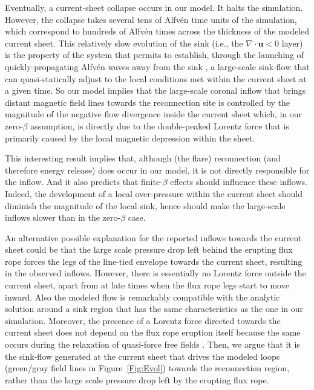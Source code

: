 \documentclass[apj]{emulateapj}
\begin{document}
Eventually, a current-sheet collapse  occurs in our model. It halts the simulation. However, the collapse takes several tens of Alfv\'{e}n time units of the simulation, which correspond to hundreds of Alfv\'{e}n times across the thickness of the modeled current sheet. This relatively slow evolution of the sink (i.e., the $\nabla \cdot \mathbf{u}<0$ layer) is the property of the system that permits to establish, through the launching of quickly-propagating Alfv\'{e}n waves away from the sink \citep[as in][]{ForbesAlone1982}, a large-scale sink-flow that can quasi-statically adjust to the local conditions met within the current sheet at a given time.
So our model implies that the large-scale coronal inflow that brings distant magnetic field lines towards the reconnection site is controlled by the magnitude of the negative flow divergence inside the current sheet which, in our zero-$\beta$ assumption, is directly due to the double-peaked Lorentz force that is primarily caused by the local magnetic depression within the sheet.

This interesting result implies that, although (the flare) reconnection (and therefore energy release) does occur in our model, it is not directly responsible for the inflow. And it also predicts that finite-$\beta$ effects should  influence these inflows. Indeed, the development of a local over-pressure within the current sheet should diminish the magnitude of the local sink, hence should make the large-scale inflows slower than in the zero-$\beta$ case. 

An alternative possible explanation for the reported inflows towards the current sheet could be that the large scale pressure drop left behind the erupting flux rope  forces the legs of the line-tied envelope towards the current sheet, resulting in the observed inflows.  However, there is essentially no Lorentz force outside the current sheet, apart from at late times when the flux rope legs start to move inward. Also the modeled flow is remarkably compatible with the analytic solution around a sink region that has the same characteristics as the one in our simulation.
Moreover, the presence of a Lorentz force directed towards the current sheet does not depend on the flux rope eruption itself because the same occurs during the relaxation of quasi-force free fields \citep[e.g.][ Sect.~3.3]{Aul2006}. Then, we argue that it is the sink-flow generated at the current sheet that drives the modeled  loops (green/gray field lines in Figure~\ref{Fig:Evol}) towards the reconnection region, rather than the large scale pressure drop left by the erupting flux rope. 
\end{document}
